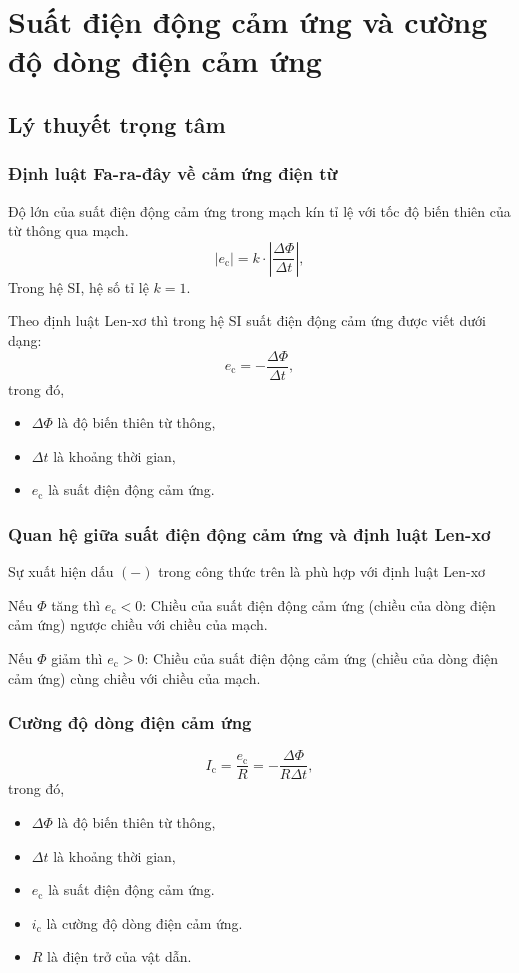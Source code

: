 \chapter{Suất điện động cảm ứng và cường độ dòng điện cảm ứng}
\section{Lý thuyết trọng tâm}
\subsection{Định luật Fa-ra-đây về cảm ứng điện từ}
Độ lớn của suất điện động cảm ứng trong mạch kín tỉ lệ với tốc độ biến thiên của từ thông qua mạch.
\begin{equation}
\left| e_\text{c}\right| =k\cdot \left|\dfrac{\Delta \Phi}{\Delta t} \right|,
\end{equation}
Trong hệ SI, hệ số tỉ lệ $k=1$.
  
Theo định luật Len-xơ thì trong hệ SI suất điện động cảm ứng được viết dưới dạng:
\begin{equation}
e_\text{c}=-\dfrac{\Delta \Phi}{\Delta t},
\end{equation}
trong đó,
\begin{itemize}
	\item $\Delta \Phi$ là độ biến thiên từ thông,
	\item $\Delta t$ là khoảng thời gian, 
	\item $e_\text{c}$ là suất điện động cảm ứng. 
\end{itemize}

\subsection{Quan hệ giữa suất điện động cảm ứng và định luật Len-xơ}
Sự xuất hiện dấu $(-)$ trong công thức trên là phù hợp với định luật Len-xơ

Nếu $\Phi$ tăng thì $e_\text{c}<0$: Chiều của suất điện động cảm ứng (chiều của dòng điện cảm ứng) ngược chiều với chiều của mạch.

Nếu $\Phi$ giảm thì $e_\text{c}>0$: Chiều của suất điện động cảm ứng (chiều của dòng điện cảm ứng) cùng chiều với chiều của mạch.

\subsection{Cường độ dòng điện cảm ứng}

\begin{equation}
I_\text{c}=\dfrac{e_\text{c}}{R}=-\dfrac{\Delta \Phi}{R\Delta t},
\end{equation}
trong đó,
\begin{itemize}
	\item $\Delta \Phi$ là độ biến thiên từ thông,
	\item $\Delta t$ là khoảng thời gian, 
	\item $e_\text{c}$ là suất điện động cảm ứng. 
	\item $i_\text{c}$ là cường độ dòng điện cảm ứng. 
	\item $R$ là điện trở của vật dẫn.
\end{itemize}
